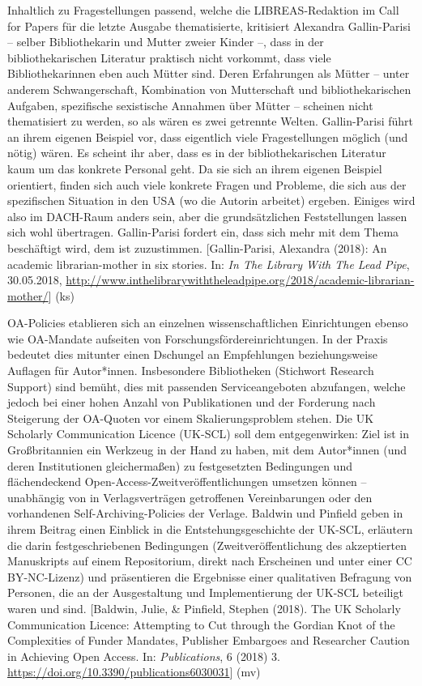 \documentclass[a4paper,
fontsize=11pt,
oneside,
numbers=noperiodatend,
parskip=half-,
bibliography=totoc,
final
]{scrartcl}
\begin{document}
Inhaltlich zu Fragestellungen passend, welche die LIBREAS-Redaktion im
Call for Papers für die letzte Ausgabe thematisierte, kritisiert
Alexandra Gallin-Parisi -- selber Bibliothekarin und Mutter zweier
Kinder --, dass in der bibliothekarischen Literatur praktisch nicht
vorkommt, dass viele Bibliothekarinnen eben auch Mütter sind. Deren
Erfahrungen als Mütter -- unter anderem Schwangerschaft, Kombination von
Mutterschaft und bibliothekarischen Aufgaben, spezifische sexistische
Annahmen über Mütter -- scheinen nicht thematisiert zu werden, so als
wären es zwei getrennte Welten. Gallin-Parisi führt an ihrem eigenen
Beispiel vor, dass eigentlich viele Fragestellungen möglich (und nötig)
wären. Es scheint ihr aber, dass es in der bibliothekarischen Literatur
kaum um das konkrete Personal geht. Da sie sich an ihrem eigenen
Beispiel orientiert, finden sich auch viele konkrete Fragen und
Probleme, die sich aus der spezifischen Situation in den USA (wo die
Autorin arbeitet) ergeben. Einiges wird also im DACH-Raum anders sein,
aber die grundsätzlichen Feststellungen lassen sich wohl übertragen.
Gallin-Parisi fordert ein, dass sich mehr mit dem Thema beschäftigt
wird, dem ist zuzustimmen. {[}Gallin-Parisi, Alexandra (2018): An
academic librarian-mother in six stories. In: \emph{In The Library With
The Lead Pipe}, 30.05.2018,
\url{http://www.inthelibrarywiththeleadpipe.org/2018/academic-librarian-mother/}{]}
(ks)

OA-Policies etablieren sich an einzelnen wissenschaftlichen
Einrichtungen ebenso wie OA-Man\-date aufseiten von
Forschungsfördereinrichtungen. In der Praxis bedeutet dies mitunter
einen Dschungel an Empfehlungen beziehungsweise Auflagen für
Autor*innen. Insbesondere Bibliotheken (Stichwort Research Support) sind
bemüht, dies mit passenden Serviceangeboten abzufangen, welche jedoch
bei einer hohen Anzahl von Publikationen und der Forderung nach
Steigerung der OA-Quoten vor einem Skalierungsproblem stehen. Die UK
Scholarly Communication Licence (UK-SCL) soll dem entgegenwirken: Ziel
ist in Großbritannien ein Werkzeug in der Hand zu haben, mit dem
Autor*innen (und deren Institutionen gleichermaßen) zu festgesetzten
Bedingungen und flächendeckend Open-Access-Zweitveröffentlichungen
umsetzen können -- unabhängig von in Verlagsverträgen getroffenen
Vereinbarungen oder den vorhandenen Self-Archiving-Policies der Verlage.
Baldwin und Pinfield geben in ihrem Beitrag einen Einblick in die
Entstehungsgeschichte der UK-SCL, erläutern die darin festgeschriebenen
Bedingungen (Zweitveröffentlichung des akzeptierten Manuskripts auf
einem Repositorium, direkt nach Erscheinen und unter einer CC
BY-NC-Lizenz) und präsentieren die Ergebnisse einer qualitativen
Befragung von Personen, die an der Ausgestaltung und Implementierung der
UK-SCL beteiligt waren und sind. {[}Baldwin, Julie, \& Pinfield, Stephen
(2018). The UK Scholarly Communication Licence: Attempting to Cut
through the Gordian Knot of the Complexities of Funder Mandates,
Publisher Embargoes and Researcher Caution in Achieving Open Access. In:
\emph{Publications}, 6 (2018) 3.
\url{https://doi.org/10.3390/publications6030031}{]} (mv)
\end{document}
